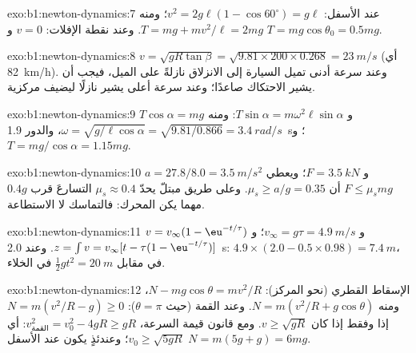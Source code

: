 \begin{solution}{exo:b1:newton-dynamics:7}
عند الأسفل: $v^2 = 2g\ell(1 - \cos 60^\circ) = g\ell$؛ ومنه $T = mg + mv^2/\ell =
2mg$. وعند نقطة الإفلات: $v = 0$ و $T = mg\cos\theta_0 = 0.5mg$.
\end{solution}

\begin{solution}{exo:b1:newton-dynamics:8}
$v = \sqrt{gR\tan\beta} = \sqrt{9.81 \times 200 \times 0.268} = \qty{23}{m/s}$
(أي \qty{82}{km/h}). وعند سرعة أدنى تميل السيارة إلى الانزلاق نازلةً على الميل، فيجب أن يشير
الاحتكاك صاعدًا؛ وعند سرعة أعلى يشير نازلًا ليضيف
 مركزية.
\end{solution}

\begin{solution}{exo:b1:newton-dynamics:9}
$T\cos\alpha = mg$ و $T\sin\alpha = m\omega^2\ell\sin\alpha$: ومنه $\omega =
\sqrt{g/\ell\cos\alpha} = \sqrt{9.81/0.866} = \qty{3.4}{rad/s}$، والدور
\qty{1.9}{s}؛ و$T = mg/\cos\alpha = 1.15mg$.
\end{solution}

\begin{solution}{exo:b1:newton-dynamics:10}
$a = 27.8/8.0 = \qty{3.5}{m/s^2}$ و $F = \qty{3.5}{kN}$؛ ويعطي $F \leq \mu_smg$
أن $\mu_s \geq a/g = 0.35$. وعلى طريق مبتلّ يحدّ $\mu_s \approx 0.4$
التسارعَ قرب $0.4g$ مهما يكن المحرك: فالتماسك لا الاستطاعة.
\end{solution}

\begin{solution}{exo:b1:newton-dynamics:11}
$v = v_\infty(1 - \eu^{-t/\tau})$ و $v_\infty = g\tau = \qty{4.9}{m/s}$؛
و$z = \int v = v_\infty[t - \tau(1 - \eu^{-t/\tau})]$. وعند \qty{2.0}{s}:
$4.9 \times (2.0 - 0.5 \times 0.98) = \qty{7.4}{m}$، في مقابل $\tfrac12 gt^2
= \qty{20}{m}$ في الخلاء.
\end{solution}

\begin{solution}{exo:b1:newton-dynamics:12}
الإسقاط القطري (نحو المركز): $N - mg\cos\theta = mv^2/R$، ومنه
$N = m(v^2/R + g\cos\theta)$. وعند القمة (حيث $\theta = \pi$): $N = m(v^2/R - g)
\geq 0$ إذا وفقط إذا كان $v \geq \sqrt{gR}$. ومع قانون قيمة السرعة، $v_{\text{القمة}}^2 =
v_0^2 - 4gR \geq gR$: أي $v_0 \geq \sqrt{5gR}$؛ وعندئذٍ يكون عند الأسفل $N =
m(5g + g) = 6mg$.
\end{solution}

